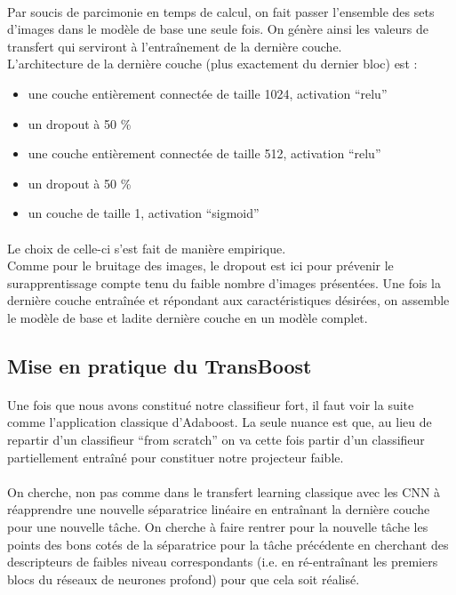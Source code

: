 \documentclass[11 pt]{article}
\begin{document}
\paragraph{}Par soucis de parcimonie en temps de calcul, on fait passer l’ensemble des sets d’images dans le modèle de base une seule fois. On génère ainsi les valeurs de transfert qui serviront à l’entraînement de la dernière couche. \\
L’architecture de la dernière couche (plus exactement du dernier bloc) est :\\ \medskip
\begin{itemize}
  \item une couche entièrement connectée de taille 1024, activation “relu”
  \item un dropout à 50 \%
  \item une couche entièrement connectée de taille 512, activation “relu”
  \item un dropout à 50 \%
  \item un couche de taille 1, activation “sigmoid”
\end{itemize}

\paragraph{}Le choix de celle-ci s’est fait de manière empirique.\\
Comme pour le bruitage des images, le dropout est ici pour prévenir le surapprentissage compte tenu du faible nombre d’images présentées.
Une fois la dernière couche entraînée et répondant aux caractéristiques désirées, on assemble le modèle de base et ladite dernière couche en un modèle complet.


\subsection{Mise en pratique du TransBoost}
\paragraph{}Une fois que nous avons constitué notre classifieur fort, il faut voir la suite comme l’application classique d’Adaboost. La seule nuance est que, au lieu de repartir d’un classifieur “from scratch” on va cette fois partir d’un classifieur partiellement entraîné pour constituer notre projecteur faible.

\paragraph{}On cherche, non pas comme dans le transfert learning classique avec les CNN à réapprendre une nouvelle séparatrice linéaire en entraînant la dernière couche pour une nouvelle tâche. On cherche à faire rentrer pour la nouvelle tâche les points des bons cotés de la séparatrice pour la tâche précédente en cherchant des descripteurs de faibles niveau correspondants (i.e. en ré-entraînant les premiers blocs du réseaux de neurones profond) pour que cela soit réalisé.
\end{document}
